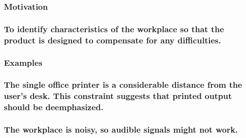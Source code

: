\documentclass[
]{article}
\begin{document}
\hypertarget{motivation-14}{%
\subsubsection{Motivation}\label{motivation-14}}

\hypertarget{to-identify-characteristics-of-the-workplace-so-that-the-product-is-designed-to-compensate-for-any-difficulties.}{%
\subsubsection{\texorpdfstring{To identify characteristics of the
workplace so that the product is designed to compensate for any
difficulties.
}{To identify characteristics of the workplace so that the product is designed to compensate for any difficulties. }}\label{to-identify-characteristics-of-the-workplace-so-that-the-product-is-designed-to-compensate-for-any-difficulties.}}

\hypertarget{examples-5}{%
\subsubsection{Examples}\label{examples-5}}

\hypertarget{the-single-office-printer-is-a-considerable-distance-from-the-users-desk.-this-constraint-suggests-that-printed-output-should-be-deemphasized.}{%
\subsubsection{\texorpdfstring{The single office printer is a
considerable distance from the user's desk. This constraint suggests
that printed output should be deemphasized.
}{The single office printer is a considerable distance from the user's desk. This constraint suggests that printed output should be deemphasized. }}\label{the-single-office-printer-is-a-considerable-distance-from-the-users-desk.-this-constraint-suggests-that-printed-output-should-be-deemphasized.}}

\hypertarget{the-workplace-is-noisy-so-audible-signals-might-not-work.}{%
\subsubsection{The workplace is noisy, so audible signals might not
work.}\label{the-workplace-is-noisy-so-audible-signals-might-not-work.}}
\end{document}
